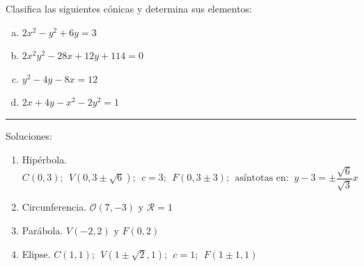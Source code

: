 \vspace{3mm}

\begin{miejercicio}

Clasifica las siguientes cónicas y determina sus elementos:

\begin{multicols}{2}
\begin{enumerate}[a) ]
\item $2x^2-y^2+6y=3$	
\item $2x^2y^2-28x+12y+114=0$
\item $y^2-4y-8x=12$
\item $2x+4y-x^2-2y^2=1$
\end{enumerate}
\end{multicols}	

\rule{250pt}{0.1pt}

\vspace{2mm} Soluciones:

\begin{enumerate}[$\triangleright\ \ $ a) ]
\item Hipérbola. $C(0,3);\ \ V(0,3\pm \sqrt 6);\ \ c=3;\ \ F(0,3\pm 3);\ \ \text{asíntotas en: } \ y-3=\pm \dfrac{\sqrt 6}{\sqrt 3}x$
\item Circunferencia. $\mathcal O(7,-3) \text{ y } \mathcal R=1$
\item Parábola. $V(-2,2) \text { y } F(0,2)$
\item Elipse. $C(1,1);\ \ V(1\pm \sqrt 2,1);\ \ c=1;\ \ F(1\pm 1,1)$
\end{enumerate}
\end{miejercicio}

